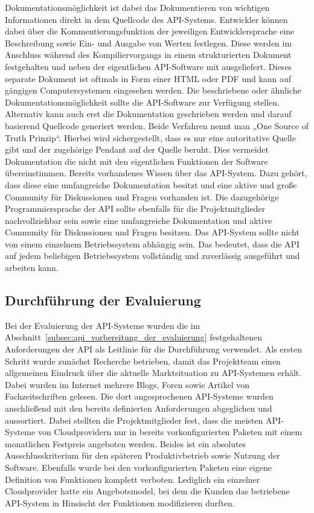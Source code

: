 \begin{outline}
  Dokumentationsmöglichkeit ist dabei das Dokumentieren von wichtigen
  Informationen direkt in dem Quellcode des \gls{API}\hyp{}Systems. Entwickler
  können dabei über die Kommentierungsfunktion der jeweiligen Entwicklersprache
  eine Beschreibung sowie Ein- und Ausgabe von Werten festlegen. Diese werden
  im Anschluss während des Kompiliervorgangs in einem strukturierten Dokument
  festgehalten und neben der eigentlichen \gls{API}\hyp{}Software mit
  ausgeliefert. Dieses separate Dokument ist oftmals in Form einer HTML oder
  PDF und kann auf gängigen Computersystemen eingesehen werden. Die
  beschriebene oder ähnliche Dokumentationsmöglichkeit sollte die
  \gls{API}\hyp{}Software zur Verfügung stellen. Alternativ kann auch erst die
  Dokumentation geschrieben werden und darauf basierend Quellcode generiert
  werden. Beide Verfahren nennt man „One Source of Truth Prinzip“. Hierbei wird
  sichergestellt, dass es nur eine autoritative Quelle gibt und der zugehörige
  Pendant auf der Quelle beruht. Dies vermeidet Dokumentation die nicht mit den
  eigentlichen Funktionen der Software übereinstimmen.
  \1 Bereits vorhandenes Wissen über das \gls{API}\hyp{}System. Dazu gehört,
  dass diese eine umfangreiche Dokumentation besitzt und eine aktive und große
  Community für Diskussionen und Fragen vorhanden ist. Die dazugehörige
  Programmiersprache der \gls{API} sollte ebenfalls für die Projektmitglieder
  nachvollziehbar sein sowie eine umfangreiche Dokumentation und aktive
  Community für Diskussionen und Fragen besitzen.
  \1 Das \gls{API}\hyp{}System sollte nicht von einem einzelnem Betriebssystem
  abhängig sein. Das bedeutet, dass die \gls{API} auf jedem beliebigen
  Betriebssystem vollständig und zuverlässig ausgeführt und arbeiten kann.
\end{outline}
\nl%

\subsection{Durchführung der Evaluierung}
\label{subsec:api_durchfuehrung_der_evaluierung}
Bei der Evaluierung der \gls{API}\hyp{}Systeme wurden die im
Abschnitt~\ref{subsec:api_vorbereitung_der_evaluierung} festgehaltenen
Anforderungen der \gls{API} als Leitlinie für die Durchführung verwendet. Als
ersten Schritt wurde zunächst Recherche betrieben, damit das Projektteam einen
allgemeinen Eindruck über die aktuelle Marktsituation zu
\gls{API}\hyp{}Systemen erhält. Dabei wurden im Internet mehrere Blogs, Foren
sowie Artikel von Fachzeitschriften gelesen. Die dort angesprochenen
\gls{API}\hyp{}Systeme wurden anschließend mit den bereits definierten
Anforderungen abgeglichen und aussortiert. Dabei stellten die Projektmitglieder
fest, dass die meisten \gls{API}\hyp{}Systeme von Cloudprovidern nur in bereits
vorkonfigurierten Paketen mit einem monatlichen Festpreis angeboten werden.
Beides ist ein absolutes Ausschlusskriterium für den späteren Produktivbetrieb
sowie Nutzung der Software. Ebenfalls wurde bei den vorkonfigurierten Paketen
eine eigene Definition von Funktionen komplett verboten. Lediglich ein
einzelner Cloudprovider hatte ein Angebotsmodel, bei dem die Kunden das
betriebene \gls{API}\hyp{}System in Hinsischt der Funktionen modifizieren
durften.

